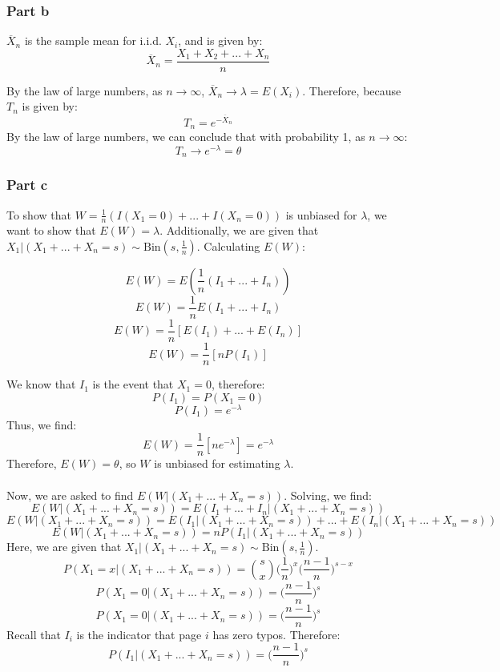 \documentclass{article}
\begin{document}
\subsubsection{Part b}
$\overline{X}_{n}$ is the sample mean for i.i.d. $X_{i}$, and is given by:
$$\overline{X}_{n} = \frac{X_{1} + X_{2} + ... + X_{n}}{n}$$

By the law of large numbers, as $n \rightarrow \infty$, $\overline{X}_{n} \rightarrow \lambda = E(X_{i})$. Therefore, because $T_{n}$ is given by:
$$T_{n} = e^{-\overline{X}_{n}}$$
By the law of large numbers, we can conclude that with probability 1, as $n \rightarrow \infty$:
$$T_{n} \rightarrow e^{-\lambda} = \theta$$

\subsubsection{Part c}
To show that $W = \frac{1}{n} (I(X_{1} = 0) + ... + I(X_{n} = 0))$ is unbiased for $\lambda$, we want to show that $E(W) = \lambda$. Additionally, we are given that $X_{1} | (X_{1} + ... + X_{n} = s) \sim \text{Bin}(s, \frac{1}{n})$. Calculating $E(W)$:

$$E(W) = E(\frac{1}{n} (I_{1} + ... + I_{n}))$$
$$E(W) = \frac{1}{n}E(I_{1} + ... + I_{n})$$
$$E(W) = \frac{1}{n}[E(I_{1}) + ... + E(I_{n})]$$
$$E(W) = \frac{1}{n}[n P(I_{1})]$$

We know that $I_{1}$ is the event that $X_{1} = 0$, therefore:
$$P(I_{1}) = P(X_{1} = 0)$$
$$P(I_{1}) = e^{-\lambda}$$
Thus, we find:
$$E(W) = \frac{1}{n}[n e^{-\lambda}] = e^{-\lambda}$$
Therefore, $E(W) = \theta$, so $W$ is unbiased for estimating $\lambda$.
\\
\\
Now, we are asked to find $E(W| (X_{1} + ... + X_{n} = s))$. Solving, we find:
$$E(W| (X_{1} + ... + X_{n} = s)) = E(I_{1} + ... + I_{n} | (X_{1} + ... + X_{n} = s))$$
$$E(W| (X_{1} + ... + X_{n} = s)) = E(I_{1} | (X_{1} + ... + X_{n} = s) ) + ... + E(I_{n} | (X_{1} + ... + X_{n} = s))$$
$$E(W| (X_{1} + ... + X_{n} = s)) = nP(I_{1} | (X_{1} + ... + X_{n} = s) )$$
Here, we are given that $X_{1} | (X_{1} + ... + X_{n} = s) \sim \text{Bin}(s, \frac{1}{n})$. 
$$P(X_{1} = x | (X_{1} + ... + X_{n} = s)) = {s \choose x}\bigg(\frac{1}{n}\bigg)^{x}\bigg(\frac{n - 1}{n}\bigg)^{s - x}$$
$$P(X_{1} = 0 | (X_{1} + ... + X_{n} = s)) = \bigg(\frac{n - 1}{n}\bigg)^{s}$$
$$P(X_{1} = 0 | (X_{1} + ... + X_{n} = s)) = \bigg(\frac{n - 1}{n}\bigg)^{s}$$
Recall that $I_{i}$ is the indicator that page $i$ has zero typos. Therefore:
$$P(I_{1} | (X_{1} + ... + X_{n} = s)) = \bigg(\frac{n - 1}{n}\bigg)^{s}$$
\end{document}
